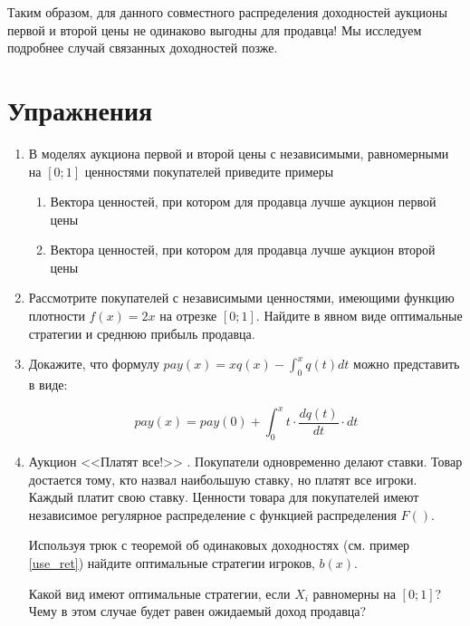 Таким образом, для данного совместного распределения доходностей аукционы первой и второй цены не одинаково выгодны для продавца! Мы исследуем подробнее случай связанных доходностей позже.



\section{Упражнения}


\begin{enumerate}
\item В моделях аукциона первой и второй цены с независимыми, равномерными на $ [0;1] $ ценностями покупателей приведите примеры
\begin{enumerate}
\item Вектора ценностей, при котором для продавца лучше аукцион первой цены
\item Вектора ценностей, при котором для продавца лучше аукцион второй цены
\end{enumerate}


\item Рассмотрите покупателей с независимыми ценностями, имеющими функцию плотности $ f(x)=2x $ на отрезке $ [0;1] $. Найдите в явном виде оптимальные стратегии и среднюю прибыль продавца.



\item Докажите, что формулу $ pay(x)=xq(x)-\int_{0}^{x}q(t)dt$ можно представить в виде:

\begin{equation}
pay(x)=pay(0)+\int_{0}^{x}t \cdot \frac{dq(t)}{dt}\cdot dt
\end{equation}



\item Аукцион <<Платят все!>> . Покупатели одновременно делают ставки. Товар достается тому, кто назвал наибольшую ставку, но платят все игроки. Каждый платит свою ставку. Ценности товара для покупателей имеют независимое регулярное распределение с функцией распределения $ F() $. 

Используя трюк с теоремой об одинаковых доходностях (см. пример \ref{use_ret}) найдите оптимальные стратегии игроков, $ b(x) $.

Какой вид имеют оптимальные стратегии, если $ X_{i} $ равномерны на $ [0;1] $? Чему в этом случае будет равен ожидаемый доход продавца?





\end{enumerate}
